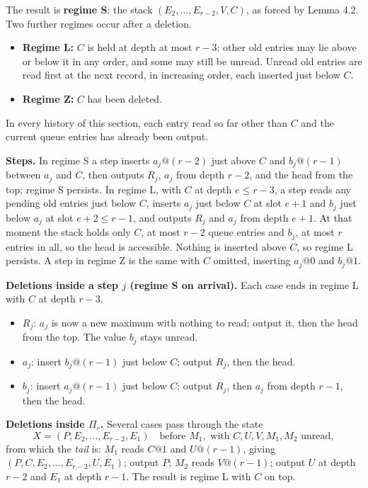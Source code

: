 \documentclass[11pt,letterpaper]{article}
\providecommand{\tightlist}{\setlength{\itemsep}{0pt}\setlength{\parskip}{0pt}}
\begin{document}
The result is \textbf{regime S}: the stack \((E_2,\dots,E_{r-2},V,C)\),
as forced by Lemma 4.2. Two further regimes occur after a deletion.

\begin{itemize}
\tightlist
\item
  \textbf{Regime L:} \(C\) is held at depth at most \(r-3\); other old
  entries may lie above or below it in any order, and some may still be
  unread. Unread old entries are read first at the next record, in
  increasing order, each inserted just below \(C\).
\item
  \textbf{Regime Z:} \(C\) has been deleted.
\end{itemize}

In every history of this section, each entry read so far other than
\(C\) and the current queue entries has already been output.

\textbf{Steps.} In regime S a step inserts \(a_j@(r-2)\) just above
\(C\) and \(b_j@(r-1)\) between \(a_j\) and \(C\), then outputs \(R_j\),
\(a_j\) from depth \(r-2\), and the head from the top; regime S
persists. In regime L, with \(C\) at depth \(e\le r-3\), a step reads
any pending old entries just below \(C\), inserts \(a_j\) just below
\(C\) at slot \(e+1\) and \(b_j\) just below \(a_j\) at slot
\(e+2\le r-1\), and outputs \(R_j\) and \(a_j\) from depth \(e+1\). At
that moment the stack holds only \(C\), at most \(r-2\) queue entries
and \(b_j\), at most \(r\) entries in all, so the head is accessible.
Nothing is inserted above \(C\), so regime L persists. A step in regime
Z is the same with \(C\) omitted, inserting \(a_j@0\) and \(b_j@1\).

\textbf{Deletions inside a step \(j\) (regime S on arrival).} Each case
ends in regime L with \(C\) at depth \(r-3\).

\begin{itemize}
\tightlist
\item
  \(R_j\): \(a_j\) is now a new maximum with nothing to read; output it,
  then the head from the top. The value \(b_j\) stays unread.
\item
  \(a_j\): insert \(b_j@(r-1)\) just below \(C\); output \(R_j\), then
  the head.
\item
  \(b_j\): insert \(a_j@(r-1)\) just below \(C\); output \(R_j\), then
  \(a_j\) from depth \(r-1\), then the head.
\end{itemize}

\textbf{Deletions inside \(\Pi_r\).} Several cases pass through the
state
\[X=(P,E_2,\dots,E_{r-2},E_1)\quad\text{before }M_1,\text{ with }C,U,V,M_1,M_2\text{ unread},\]
from which the \emph{tail} is: \(M_1\) reads \(C@1\) and \(U@(r-1)\),
giving \((P,C,E_2,\dots,E_{r-2},U,E_1)\); output \(P\); \(M_2\) reads
\(V@(r-1)\); output \(U\) at depth \(r-2\) and \(E_1\) at depth \(r-1\).
The result is regime L with \(C\) on top.
\end{document}
